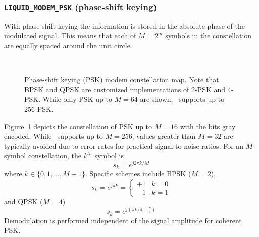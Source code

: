 \subsubsection{{\tt LIQUID\_MODEM\_PSK} (phase-shift keying)}
\label{module:modem:digital:PSK}
With phase-shift keying the information is stored in the absolute phase
of the modulated signal.
This means that each of $M=2^m$ symbols in the constellation are equally
spaced around the unit circle.
%
\begin{figure}
\centering
\mbox{
   \quad
   \quad
}
\mbox{
   \quad
   \quad
}
\mbox{
   \quad
   \quad
}
\caption{
    Phase-shift keying (PSK) modem constellation map.
    Note that BPSK and QPSK are customized implementations of 2-PSK and
    4-PSK.
    While only PSK up to $M=64$ are shown, \liquid\ supports up to
    256-PSK.
}
\label{fig:modem:psk}
\end{figure}
%
Figure~\ref{fig:modem:psk} depicts the constellation of PSK up to $M=16$
with the bits gray encoded.
While \liquid\ supports up to $M=256$, values greater than $M=32$
are typically avoided due to error rates for practical signal-to-noise
ratios.
%
For an $M$-symbol constellation, the $k^{th}$ symbol is
%
\begin{equation}
    s_k = e^{j 2 \pi k/M}
\end{equation}
%
where $k \in \{0,1,\ldots,M-1\}$.
Specific schemes include BPSK ($M=2$),
%
\begin{equation}
    s_k = e^{j \pi k} =
    \begin{cases}
        +1 & k=0 \\
        -1 & k=1
    \end{cases}
\end{equation}
%
and QPSK ($M=4$)
%
\begin{equation}
    s_k = e^{j\left(\pi k/4 + \frac{\pi}{4}\right)}
\end{equation}
%
Demodulation is performed independent of the signal amplitude for
coherent PSK.


